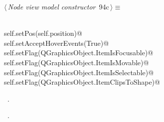\documentclass[
    a4paper,      %
    10pt,         %
    openright,    %
    notitlepage,  %
    parskip=half, %
]{scrreprt}       %
\theoremstyle{definition}                    %
\begin{document}
\begin{flushleft} \small
\begin{minipage}{\linewidth}\label{scrap156}\raggedright\small
{} $\langle\,${\itshape Node view model constructor}\nobreak\ {\footnotesize {94c}}$\,\rangle\equiv$
\vspace{-1exm}
\begin{list}{}{} \item
\mbox{}\lstinline@@\\
\mbox{}\lstinline@    self.setPos(self.position)@\\
\mbox{}\lstinline@    self.setAcceptHoverEvents(True)@\\
\mbox{}\lstinline@    self.setFlag(QGraphicsObject.ItemIsFocusable)@\\
\mbox{}\lstinline@    self.setFlag(QGraphicsObject.ItemIsMovable)@\\
\mbox{}\lstinline@    self.setFlag(QGraphicsObject.ItemIsSelectable)@\\
\mbox{}\lstinline@    self.setFlag(QGraphicsObject.ItemClipsToShape)@\\
\mbox{}\lstinline@@{\NWsep}
\end{list}
\vspace{-1.5ex}
\footnotesize
\begin{list}{}{\setlength{\itemsep}{-\parsep}\setlength{\itemindent}{-\leftmargin}}
\item \NWtxtMacroDefBy\ .
\item \NWtxtMacroRefIn\ .

\item{}
\end{list}
\end{minipage}\vspace{4ex}
\end{flushleft}
\end{document}
